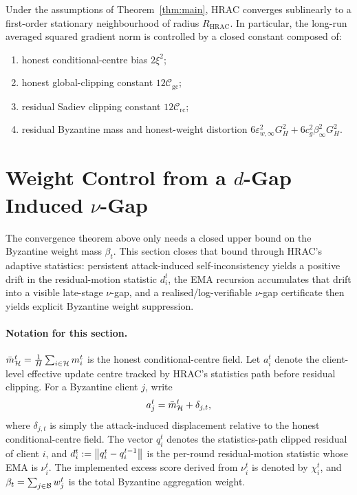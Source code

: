 \begin{corollary}
\label{cor:vanishing}
Under the assumptions of Theorem~\ref{thm:main}, HRAC converges sublinearly to
a first-order stationary neighbourhood of radius \(R_{\mathrm{HRAC}}\). In
particular, the long-run averaged squared gradient norm is controlled by a
closed constant composed of:
\begin{enumerate}[label=\arabic*.]
    \item honest conditional-centre bias \(2\xi^2\);
    \item honest global-clipping constant \(12\mathcal C_{\mathrm{gc}}\);
    \item residual Sadiev clipping constant \(12\mathcal C_{\mathrm{rc}}\);
    \item residual Byzantine mass and honest-weight distortion
    \(6\varepsilon_{w,\infty}^2G_H^2
    +6c_g^2\beta_\infty^2G_H^2\).
\end{enumerate}
\end{corollary}

\section{Weight Control from a \texorpdfstring{\(d\)}{d}-Gap Induced
\texorpdfstring{\(\nu\)}{nu}-Gap}
\label{sec:d_gap_induced_nu_weight}

The convergence theorem above only needs a closed upper bound on the Byzantine
weight mass \(\beta_t\). This section closes that bound through HRAC's adaptive
statistics: persistent attack-induced self-inconsistency yields a positive
drift in the residual-motion statistic \(d_i^t\), the EMA recursion accumulates
that drift into a visible late-stage \(\nu\)-gap, and a realised/log-verifiable
\(\nu\)-gap certificate then yields explicit Byzantine weight suppression.


\paragraph{Notation for this section.}
\(\bar m_{\mathcal{H}}^t=\frac1H\sum_{i\in\mathcal{H}}m_i^t\) is the honest conditional-centre
field. Let \(a_i^t\) denote the client-level effective update centre tracked by
HRAC's statistics path before residual clipping. For a Byzantine client \(j\),
write
\[
    a_j^t=\bar m_{\mathcal{H}}^t+\delta_{j,t},
\]
where \(\delta_{j,t}\) is simply the attack-induced displacement relative to
the honest conditional-centre field. The vector \(q_i^t\) denotes the
statistics-path clipped residual of client \(i\), and
\(d_i^t:=\left\lVert q_i^t-q_i^{t-1} \right\rVert\) is the per-round residual-motion statistic
whose EMA is \(\nu_i^t\). The implemented excess score derived from \(\nu_i^t\)
is denoted by \(\chi_i^t\), and
\(\beta_t=\sum_{j\in\mathcal{B}}w_j^t\) is the total Byzantine aggregation weight.

